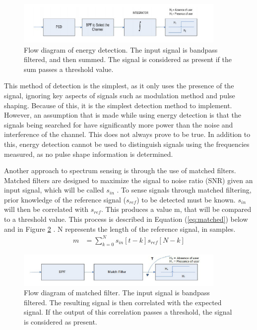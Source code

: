 \begin{figure}[ht]
\centering
\includegraphics[width=0.90\textwidth]{img/energy_detection.png}
\caption{Flow diagram of energy detection. The input signal is bandpass filtered, and then summed. The signal is considered as present if the sum passes a threshold value.}
\label{fig:energy_detection}
\end{figure}\par

This method of detection is the simplest, as it only uses the presence of the signal, ignoring key aspects of signals such as modulation method and pulse shaping. Because of this, it is the simplest detection method to implement. However, an assumption that is made while using energy detection is that the signals being searched for have significantly more power than the noise and interference of the channel. This does not always prove to be true. In addition to this, energy detection cannot be used to distinguish signals using the frequencies measured, as no pulse shape information is determined.\par
Another approach to spectrum sensing is through the use of matched filters. Matched filters are designed to maximize the signal to noise ratio (SNR) given an input signal, which will be called $s_{in}$ \cite{sensing_energy}. To sense signals through matched filtering, prior knowledge of the reference signal ($s_{ref}$) to be detected must be known. $s_{in}$ will then be correlated with $s_{ref}$. This produces a value m, that will be compared to a threshold value. This process is described in Equation (\ref{eq:matched}) below and in Figure \ref{figure:matched_filter}
. N represents the length of the reference signal, in samples. 
\begin{align} \label{eq:matched}
    m &= \sum_{k = 0}^{N}s_{in}[t-k]s_{ref}[N-k] 
\end{align}
\begin{figure}[ht]
\centering
\includegraphics[width=0.90\textwidth]{img/match_filter.png}
\caption{Flow diagram of matched filter. The input signal is bandpass filtered. The resulting signal is then correlated with the expected signal. If the output of this correlation passes a threshold, the signal is considered as present.}
\label{figure:matched_filter}
\end{figure}\par
